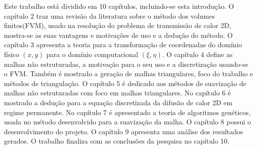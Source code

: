 Este trabalho está dividido em 10 capítulos, incluindo-se esta introdução.
O capítulo 2 traz uma revisão da literatura sobre o método dos volumes finitos(FVM), usado na resolução do problema de transmissão de calor 2D, mostra-se as suas vantagens e motivações de uso e a dedução do método.
O capítulo 3 apresenta a teoria para a transformação de coordenadas do domínio físico $(x,y)$ para o domínio computacional $(\xi,\eta)$.
O capítulo 4 define as malhas não estruturadas, a motivação para o seu uso e a discretização usando-se o FVM. Também é mostrado a geração de malhas triangulares, foco do trabalho e métodos de triangulação.
O capítulo 5 é dedicado aos métodos de suavização de malhas não estruturadas com foco em malhas triangulares.
No capítulo 6 é mostrado a dedução para a equação discretizada da difusão de calor 2D em regime permanente.
No capítulo 7 é apresentado a teoria de algoritmos genéticos, usada no método desenvolvido para a suavização da malha.
O capítulo 8 possui o desenvolvimento do projeto.
O capítulo 9 apresenta uma análise dos resultados gerados.
O trabalho finaliza com as conclusões da pesquisa no capítulo 10.




  






